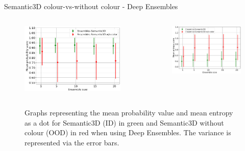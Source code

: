 \documentclass[aspectratio=169]{beamer}
\begin{document}
\begin{frame}{Semantic3D colour-vs-without colour - Deep Ensembles}
    \begin{columns}
        \begin{column}{0.5\textwidth}
            \begin{figure}
                \centering
                \includegraphics[scale=0.25]{images/ood2/DE_MSP_OOD2.jpg}
            \end{figure}
        \end{column}
        \begin{column}{0.5\textwidth}
            \begin{figure}
                \centering
                \includegraphics[scale=0.32]{images/ood2/DE_Ent_OOD2.jpg}
            \end{figure}
        \end{column}
    \end{columns}
    \begin{figure}
        \caption{Graphs representing the mean probability value and mean entropy as a dot for Semantic3D (ID) in green and
        Semantic3D without colour (OOD) in red when using Deep Ensembles. The variance is represented via the error bars.}
    \end{figure}
\end{frame}
\end{document}
